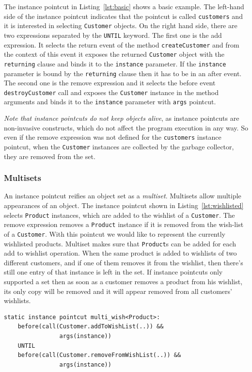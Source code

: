 \documentclass{acm_proc_article-sp}
\begin{document}
The instance pointcut in Listing~\ref{lst:basic} shows a basic example. The left-hand side of the instance pointcut indicates that the pointcut is called \texttt{customers} and it is interested in selecting \texttt{Customer} objects. 
On the right hand side, there are two expressions separated by the \texttt{UNTIL} keyword. The first one is the add expression. It selects the return event of the method \texttt{createCustomer} and from the context of this event it exposes the returned \texttt{Customer} object with the \texttt{returning} clause and binds it to the \texttt{instance} parameter. If the \texttt{instance} parameter is bound by the \texttt{returning} clause then it has to be in an after event. The second one is the remove expression and it selects the before event \texttt{destroyCustomer} call and exposes the \texttt{Customer} instance in the method arguments and binds it to the \texttt{instance} parameter with \texttt{args} pointcut.


\emph{Note that instance pointcuts do not keep objects alive}, as instance pointcuts are non-invasive constructs, which do not affect the program execution in any way. So even if the remove expression was not defined for the \texttt{customers} instance pointcut, when the \texttt{Customer} instances are collected by the garbage collector, they are removed from the set. 


\subsubsection{Multisets}
An instance pointcut reifies an object set as a \emph{multiset}. Multisets allow multiple appearances of an object. The instance pointcut shown in Listing~\ref{lst:wishlisted} selects \texttt{Product} instances, which are added to the wishlist of a \texttt{Customer}. The remove expression removes a \texttt{Product} instance if it is removed from the wish-list of a \texttt{Customer}. With this pointcut we would like to represent the currently wishlisted products. Multiset makes sure that \texttt{Product}s can be added for each add to wishlist operation. When the same product is added to wishlists of two different customers, and if one of them removes it from the wishlist, then there's still one entry of that instance is left in the set.  If instance pointcuts only supported a set then as soon as a customer removes a product from his wishlist, its only copy will be removed and it will appear removed from all customers' wishlists.

\begin{lstlisting}[float=h!, caption={An instance pointcut utilizing multiset property}, label={lst:wishlisted}]
static instance pointcut multi_wish<Product>: 
	before(call(Customer.addToWishList(..)) && 
				args(instance))
	UNTIL 
	before(call(Customer.removeFromWishList(..)) && 
				args(instance))
\end{lstlisting}
\end{document}
